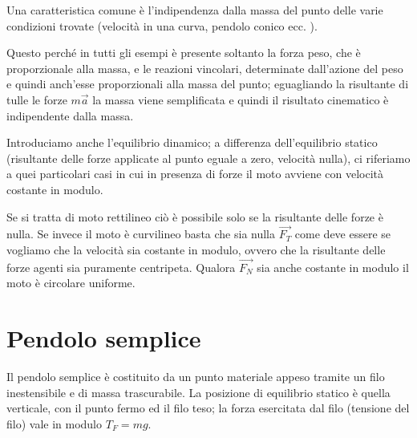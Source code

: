 \documentclass[class=book, crop=false, oneside, 12pt]{standalone}
\begin{document}
Una caratteristica comune è l'indipendenza dalla massa del punto delle varie condizioni trovate (velocità in una curva, pendolo conico ecc. ).

Questo perché in tutti gli esempi è presente soltanto la forza peso, che è proporzionale alla massa, e le reazioni vincolari, determinate dall'azione del peso e quindi anch'esse proporzionali alla massa del punto; eguagliando la risultante di tulle le forze \(m \overrightarrow{a}\) la massa viene semplificata e quindi il risultato cinematico è indipendente dalla massa.

Introduciamo anche l'equilibrio dinamico; a differenza dell'equilibrio statico (risultante delle forze applicate al punto eguale a zero, velocità nulla), ci riferiamo a quei particolari casi in cui in presenza di forze il moto avviene con velocità costante in modulo. 

Se si tratta di moto rettilineo ciò è possibile solo se la risultante delle forze è nulla.
Se invece il moto è curvilineo basta che sia nulla \(\overrightarrow{F_T}\) come deve essere se vogliamo che la velocità sia costante in modulo, ovvero che la risultante delle forze agenti sia puramente centripeta.
Qualora \(\overrightarrow{F_N}\) sia anche costante in modulo il moto è circolare uniforme. 

\section{Pendolo semplice}

Il pendolo semplice è costituito da un punto materiale appeso tramite un filo inestensibile e di massa trascurabile. 
La posizione di equilibrio statico è quella verticale, con il punto fermo ed il filo teso; la forza esercitata dal filo (tensione del filo) vale in modulo \(T_F = mg\).
\end{document}
